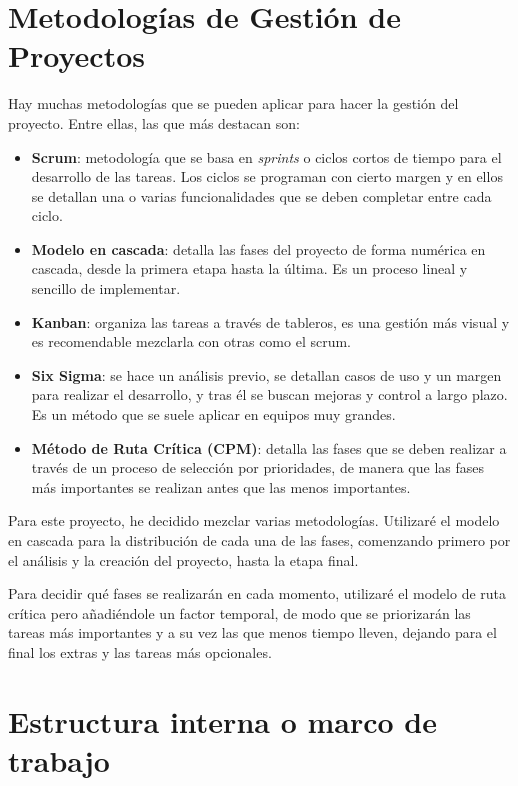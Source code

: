 \section{Metodologías de Gestión de Proyectos}
Hay muchas metodologías que se pueden aplicar para hacer la gestión del proyecto. Entre ellas, las que más destacan son:
\begin{itemize}
 \item \textbf{Scrum}: metodología que se basa en \emph{sprints} o ciclos cortos de tiempo para el desarrollo de las tareas. Los ciclos se programan con cierto margen y en ellos se detallan una o varias funcionalidades que se deben completar entre cada ciclo.
 \item \textbf{Modelo en cascada}: detalla las fases del proyecto de forma numérica en cascada, desde la primera etapa hasta la última. Es un proceso lineal y sencillo de implementar.
 \item \textbf{Kanban}: organiza las tareas a través de tableros, es una gestión más visual y es recomendable mezclarla con otras como el scrum.
 \item \textbf{Six Sigma}: se hace un análisis previo, se detallan casos de uso y un margen para realizar el desarrollo, y tras él se buscan mejoras y control a largo plazo. Es un método que se suele aplicar en equipos muy grandes.
 \item \textbf{Método de Ruta Crítica (CPM)}: detalla las fases que se deben realizar a través de un proceso de selección por prioridades, de manera que las fases más importantes se realizan antes que las menos importantes.
\end{itemize}

Para este proyecto, he decidido mezclar varias metodologías. Utilizaré el modelo en cascada para la distribución de cada una de las fases, comenzando primero por el análisis y la creación del proyecto, hasta la etapa final.

Para decidir qué fases se realizarán en cada momento, utilizaré el modelo de ruta crítica pero añadiéndole un factor temporal, de modo que se priorizarán las tareas más importantes y a su vez las que menos tiempo lleven, dejando para el final los extras y las tareas más opcionales.



\section{Estructura interna o marco de trabajo}
